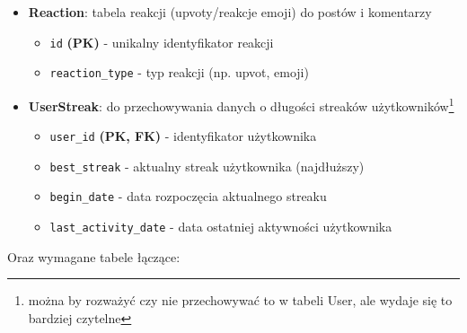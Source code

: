 \documentclass[11pt,a4paper]{article}
\numberwithin{equation}{section}
\begin{document}
\begin{itemize}
\begin{itemize}
            \item \texttt{content} - treść komentarza
            \item \texttt{creation\_date} - data i czas utworzenia komentarza
        \end{itemize}
    \item \textbf{Reaction}: tabela reakcji (upvoty/reakcje emoji) do postów i komentarzy
        \begin{itemize}
            \item \texttt{id} \textbf{(PK)} - unikalny identyfikator reakcji
            \item \texttt{reaction\_type} - typ reakcji (np. upvot, emoji)
        \end{itemize}
    \item \textbf{UserStreak}: do przechowywania danych o długości streaków użytkowników\footnote{można by rozważyć czy nie przechowywać to w tabeli User, ale wydaje się to bardziej czytelne}
        \begin{itemize}
            \item \texttt{user\_id} \textbf{(PK, FK)} - identyfikator użytkownika
            \item \texttt{best\_streak} - aktualny streak użytkownika (najdłuższy)
            \item \texttt{begin\_date} - data rozpoczęcia aktualnego streaku
            \item \texttt{last\_activity\_date} - data ostatniej aktywności użytkownika
        \end{itemize}
\end{itemize}
Oraz wymagane tabele łączące:
\end{document}
